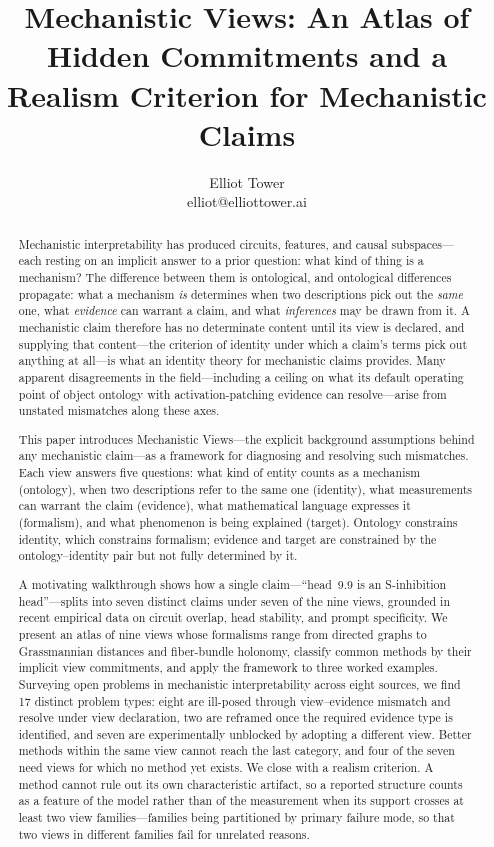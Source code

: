 \documentclass{article}
\title{Mechanistic Views: An Atlas of Hidden Commitments and a Realism Criterion for Mechanistic Claims}
\author{\name Elliot Tower \\
      \email elliot@elliottower.ai}
\begin{document}
\maketitle

\begin{abstract}
Mechanistic interpretability has produced circuits, features, and causal
subspaces---each resting on an implicit answer to a prior question:
what kind of thing is a mechanism?
The difference between them is ontological, and ontological differences
propagate: what a mechanism \emph{is} determines
when two descriptions pick out the \emph{same} one, what \emph{evidence}
can warrant a claim, and what \emph{inferences} may be drawn from it.
A mechanistic claim therefore has no determinate content until its view is
declared, and supplying that content---the criterion of identity under
which a claim's terms pick out anything at all---is what an identity
theory for mechanistic claims provides.
Many apparent disagreements in the field---including a ceiling on what
its default operating point of object ontology with activation-patching
evidence can resolve---arise from unstated mismatches along these axes.

This paper introduces Mechanistic Views---the explicit
background assumptions behind any mechanistic claim---as a framework
for diagnosing and resolving such mismatches.  Each view answers five
questions: what kind of entity counts as a mechanism (ontology), when
two descriptions refer to the same one (identity), what measurements
can warrant the claim (evidence), what mathematical language expresses
it (formalism), and what phenomenon is being explained (target).
Ontology constrains identity, which constrains formalism; evidence and
target are constrained by the ontology--identity pair but not fully
determined by it.

A motivating walkthrough shows how a single claim---``head~9.9
is an S-inhibition head''---splits into seven distinct claims under
seven of the nine views, grounded in recent empirical data on circuit
overlap,
head stability, and prompt specificity.
We present an atlas of nine views whose formalisms range from directed
graphs to Grassmannian distances and fiber-bundle holonomy, classify
common methods by their implicit view commitments, and apply the
framework to three worked examples.  Surveying open problems in
mechanistic interpretability across eight sources, we find 17 distinct
problem types: eight are ill-posed through view--evidence mismatch and
resolve under view declaration, two are reframed once the required
evidence type is identified, and seven are experimentally unblocked by
adopting a different view.
Better methods within the same view cannot reach the last category, and
four of the seven need views for which no method yet exists.
We close with a realism criterion.  A method cannot rule out its own
characteristic artifact, so a reported structure counts as a feature of
the model rather than of the measurement when its support crosses at
least two view families---families being partitioned by primary failure
mode, so that two views in different families fail for unrelated reasons.
\end{abstract}
\end{document}
